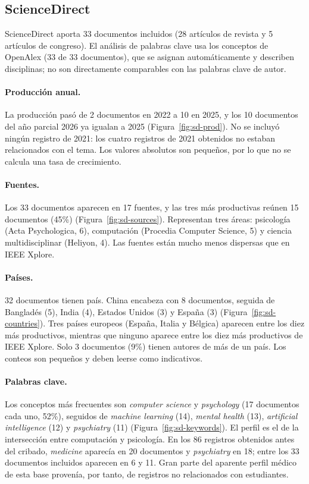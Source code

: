 \documentclass[11pt,a4paper]{article}
\begin{document}
\subsection{ScienceDirect}

ScienceDirect aporta 33 documentos incluidos (28 artículos de revista y 5 artículos de congreso). El análisis de palabras clave usa los conceptos de OpenAlex (33 de 33 documentos), que se asignan automáticamente y describen disciplinas; no son directamente comparables con las palabras clave de autor.

\paragraph{Producción anual.} La producción pasó de 2 documentos en 2022 a 10 en 2025, y los 10 documentos del año parcial 2026 ya igualan a 2025 (Figura~\ref{fig:sd-prod}). No se incluyó ningún registro de 2021: los cuatro registros de 2021 obtenidos no estaban relacionados con el tema. Los valores absolutos son pequeños, por lo que no se calcula una tasa de crecimiento.

\paragraph{Fuentes.} Los 33 documentos aparecen en 17 fuentes, y las tres más productivas reúnen 15 documentos (45\%) (Figura~\ref{fig:sd-sources}). Representan tres áreas: psicología (Acta Psychologica, 6), computación (Procedia Computer Science, 5) y ciencia multidisciplinar (Heliyon, 4). Las fuentes están mucho menos dispersas que en IEEE Xplore.

\paragraph{Países.} 32 documentos tienen país. China encabeza con 8 documentos, seguida de Bangladés (5), India (4), Estados Unidos (3) y España (3) (Figura~\ref{fig:sd-countries}). Tres países europeos (España, Italia y Bélgica) aparecen entre los diez más productivos, mientras que ninguno aparece entre los diez más productivos de IEEE Xplore. Solo 3 documentos (9\%) tienen autores de más de un país. Los conteos son pequeños y deben leerse como indicativos.

\paragraph{Palabras clave.} Los conceptos más frecuentes son \emph{computer science} y \emph{psychology} (17 documentos cada uno, 52\%), seguidos de \emph{machine learning} (14), \emph{mental health} (13), \emph{artificial intelligence} (12) y \emph{psychiatry} (11) (Figura~\ref{fig:sd-keywords}). El perfil es el de la intersección entre computación y psicología. En los 86 registros obtenidos antes del cribado, \emph{medicine} aparecía en 20 documentos y \emph{psychiatry} en 18; entre los 33 documentos incluidos aparecen en 6 y 11. Gran parte del aparente perfil médico de esta base provenía, por tanto, de registros no relacionados con estudiantes.
\end{document}
